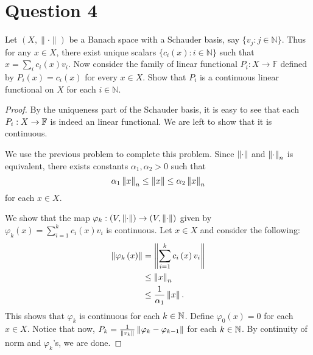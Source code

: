 \section{Question 4}
\horz

Let $(X,\|\cdot\|)$ be a Banach space with a Schauder basis, say $\{v_j: j\in\mathbb N\}.$ Thus for any $x\in X$, there exist  unique scalars $\{c_i(x): i\in\mathbb N\}$ such that $x= \sum_i c_i(x) v_i.$ Now consider the family of linear functional $P_i : X \to \mathbb F$ defined by $P_i(x) = c_i(x)$ for every $x\in X.$ Show that  $P_i$ is a continuous linear functional on $X$ for each $i\in \mathbb N.$

\horz

\begin{proof}
    By the uniqueness part of the Schauder basis, it is easy to see that each $P_{i} : X \to \mathbb F$ is indeed an linear functional. We are left to show that it is continuous. 

    We use the previous problem to complete this problem. Since $\left\lVert \cdot \right\rVert$ and $\left\lVert \cdot \right\rVert_{n}$ is equivalent, there exists constants $\alpha_1 , \alpha_2 > 0$ such that 
    \begin{equation*}
	\alpha_{1} \left\lVert x \right\rVert_{n} \le \left\lVert x \right\rVert \le \alpha_{2} \left\lVert x \right\rVert_{n}
    \end{equation*}
    for each $x\in X$.


    We show that the map $\varphi_{k} : \left( V, \left\lVert \cdot \right\rVert \right) \to \left( V, \left\lVert \cdot \right\rVert \right)$ given by $\varphi _{k} \left( x \right) = \sum_{i=1}^{k} c_{i} \left( x \right) v_{i}$ is continuous. Let $x \in X$ and consider the following:
    \begin{align*}
	\left\lVert \varphi_{k} \left( x \right) \right\rVert &= \left\lVert \sum_{i=1}^{k} c_{i} \left( x \right) v_{i} \right\rVert \\
	&\le \left\lVert x \right\rVert_{n} \\
	&\le \frac{1}{\alpha_{1}} \left\lVert x \right\rVert.
    \end{align*}
    This shows that $\varphi_{k}$ is continuous for each $k\in \mathbb N$. Define $\varphi_{0} (x)=0$ for each $x\in X$. Notice that now, $P_{k} = \frac{1}{\left\lVert v_{k} \right\rVert} \left\lVert \varphi_{k} - \varphi_{k-1} \right\rVert$ for each $k\in \mathbb N$. By continuity of norm and $\varphi_{k}$'s, we are done.
\end{proof}
